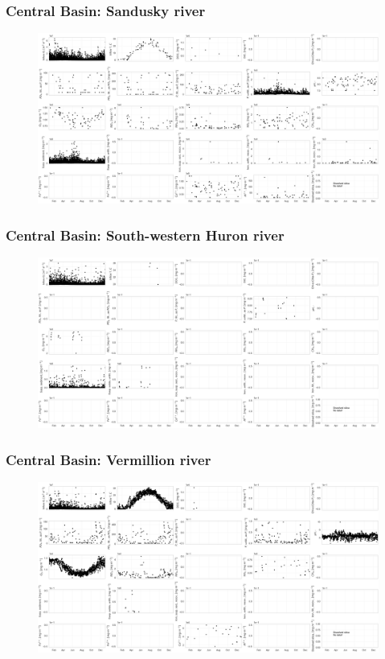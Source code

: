 \documentclass{beamer}
\begin{document}
\begin{frame}
\frametitle{Central Basin: Sandusky river}
\begin{figure}
\includegraphics[width=\textwidth]{rivers/Central basin/plot_1yr sanduskyriver.png}
\end{figure}
\end{frame}

\begin{frame}
\frametitle{Central Basin: South-western Huron river}
\begin{figure}
\includegraphics[width=\textwidth]{rivers/Central basin/plot_1yr southwesternhuronriver.png}
\end{figure}
\end{frame}

\begin{frame}
\frametitle{Central Basin: Vermillion river}
\begin{figure}
\includegraphics[width=\textwidth]{rivers/Central basin/plot_1yr vermillion.png}
\end{figure}
\end{frame}
\end{document}
